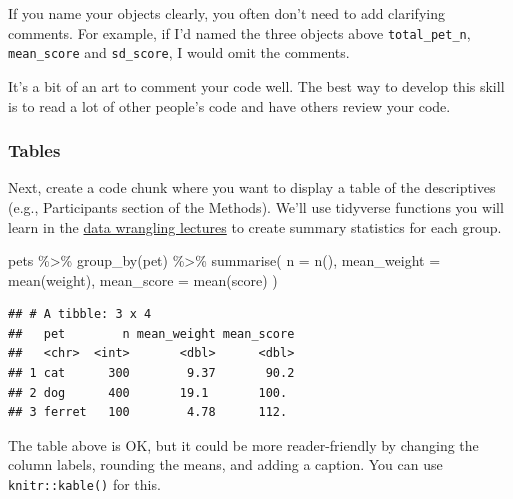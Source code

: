 \documentclass[
  oneside]{book}
\newenvironment{Shaded}{\begin{snugshade}}{\end{snugshade}}
\newcommand{\AttributeTok}[1]{\textcolor[rgb]{0.77,0.63,0.00}{#1}}
\newcommand{\FunctionTok}[1]{\textcolor[rgb]{0.00,0.00,0.00}{#1}}
\newcommand{\NormalTok}[1]{#1}
\newcommand{\SpecialCharTok}[1]{\textcolor[rgb]{0.00,0.00,0.00}{#1}}
\begin{document}
If you name your objects clearly, you often don't need to add clarifying comments. For example, if I'd named the three objects above \texttt{total\_pet\_n}, \texttt{mean\_score} and \texttt{sd\_score}, I would omit the comments.

It's a bit of an art to comment your code well. The best way to develop this skill is to read a lot of other people's code and have others review your code.

\hypertarget{tables}{%
\subsubsection{Tables}\label{tables}}

Next, create a code chunk where you want to display a table of the descriptives (e.g., Participants section of the Methods). We'll use tidyverse functions you will learn in the \protect\hyperlink{tidyr}{data wrangling lectures} to create summary statistics for each group.

\begin{Shaded}
\begin{Highlighting}[]
\NormalTok{pets }\SpecialCharTok{\%\textgreater{}\%}
  \FunctionTok{group\_by}\NormalTok{(pet) }\SpecialCharTok{\%\textgreater{}\%}
  \FunctionTok{summarise}\NormalTok{(}
    \AttributeTok{n =} \FunctionTok{n}\NormalTok{(),}
    \AttributeTok{mean\_weight =} \FunctionTok{mean}\NormalTok{(weight),}
    \AttributeTok{mean\_score =} \FunctionTok{mean}\NormalTok{(score)}
\NormalTok{  )}
\end{Highlighting}
\end{Shaded}

\begin{verbatim}
## # A tibble: 3 x 4
##   pet        n mean_weight mean_score
##   <chr>  <int>       <dbl>      <dbl>
## 1 cat      300        9.37       90.2
## 2 dog      400       19.1       100. 
## 3 ferret   100        4.78      112.
\end{verbatim}

The table above is OK, but it could be more reader-friendly by changing the column labels, rounding the means, and adding a caption. You can use \texttt{knitr::kable()} for this.
\end{document}
